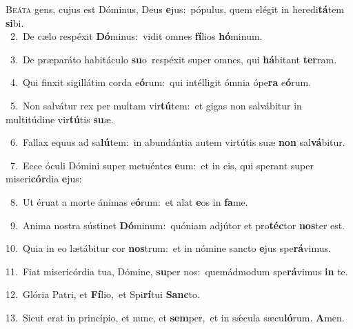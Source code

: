 \lettrine{\initial\textcolor{\initialcolor}{B}}{eáta} gens, cujus est Dóminus, Deus \textbf{e}\-jus:~\star pópulus, quem elégit in heredi\-\textbf{tá}\-tem \textbf{si}\-bi.\\
{\numbfont\textcolor{\numbcolor}{~2.}}~De cælo respéxit \textbf{Dó}\-minus:~\star vidit omnes \textbf{fí}\-lios \textbf{hó}\-minum.\par
{\numbfont\textcolor{\numbcolor}{~3.}}~De præparáto habitáculo \textbf{su}\-o~\star respéxit super omnes, qui \textbf{há}\-bitant \textbf{ter}\-ram.\par
{\numbfont\textcolor{\numbcolor}{~4.}}~Qui finxit sigillátim corda e\-\textbf{ó}\-rum:~\star qui intélligit ómnia ópe\textbf{ra} e\-\textbf{ó}\-rum.\par
{\numbfont\textcolor{\numbcolor}{~5.}}~Non salvátur rex per multam vir\-\textbf{tú}\-tem:~\star et gigas non salvábitur in multitúdine vir\-\textbf{tú}\-tis \textbf{su}\-æ.\par
{\numbfont\textcolor{\numbcolor}{~6.}}~Fallax equus ad sa\-\textbf{lú}\-tem:~\star in abundántia autem virtútis suæ \textbf{non} sal\-\textbf{vá}\-bitur.\par
{\numbfont\textcolor{\numbcolor}{~7.}}~Ecce óculi Dómini super metuéntes \textbf{e}\-um:~\star et in eis, qui sperant super miseri\-\textbf{cór}\-dia \textbf{e}\-jus:\par
{\numbfont\textcolor{\numbcolor}{~8.}}~Ut éruat a morte ánimas e\-\textbf{ó}\-rum:~\star et alat \textbf{e}\-os in \textbf{fa}\-me.\par
{\numbfont\textcolor{\numbcolor}{~9.}}~Anima nostra sústinet \textbf{Dó}\-minum:~\star quóniam adjútor et pro\-\textbf{téc}\-tor \textbf{nos}\-ter est.\par
{\numbfont\textcolor{\numbcolor}{10.}}~Quia in eo lætábitur cor \textbf{nos}\-trum:~\star et in nómine sancto \textbf{e}\-jus spe\-\textbf{rá}\-vimus.\par
{\numbfont\textcolor{\numbcolor}{11.}}~Fiat misericórdia tua, Dómine, \textbf{su}\-per nos:~\star quemádmodum spe\-\textbf{rá}\-vimus \textbf{in} te.\par
{\numbfont\textcolor{\numbcolor}{12.}}~Glória Patri, et \textbf{Fí}\-lio,~\star et Spi\-\textbf{rí}\-tui \textbf{Sanc}\-to.\par
{\numbfont\textcolor{\numbcolor}{13.}}~Sicut erat in princípio, et nunc, et \textbf{sem}\-per,~\star et in sǽcula sæcu\-\textbf{ló}\-rum. \textbf{A}\-men.\par
